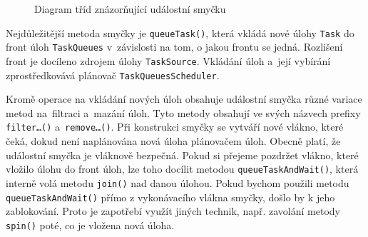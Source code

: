 \begin{figure}[H]
  \begin{center}
    \caption{Diagram tříd znázorňující událostní smyčku}
    \label{Figure.EventLoop}
  \end{center}
\end{figure}

Nejdůležitější metoda smyčky je \texttt{queueTask()}, která vkládá nové úlohy \texttt{Task} do front úloh \texttt{TaskQueues} v~závislosti na tom, o jakou frontu se jedná. Rozlišení front je docíleno zdrojem úlohy \texttt{TaskSource}. Vkládání úloh a~její vybírání zprostředkovává plánovač \texttt{TaskQueuesScheduler}.
 
Kromě operace na vkládání nových úloh obsahuje událostní smyčka různé variace metod na~filtraci a~mazání úloh. Tyto metody obsahují ve svých názvech prefixy \texttt{filter\ldots()} a~\texttt{remove\ldots()}. Při konstrukci smyčky se vytváří nové vlákno, které čeká, dokud není naplánována nová úloha plánovačem úloh. Obecně platí, že událostní smyčka je vláknově bezpečná. Pokud si přejeme pozdržet vlákno, které vložilo úlohu do front úloh, lze toho docílit metodou \texttt{queueTaskAndWait()}, která interně volá metodu \texttt{join()} nad danou úlohou. Pokud bychom použili metodu \texttt{queueTaskAndWait()} přímo z vykonávacího vlákna smyčky, došlo by k jeho zablokování. Proto je zapotřebí využít jiných technik, např. zavolání metody \texttt{spin()} poté, co je vložena nová úloha.

